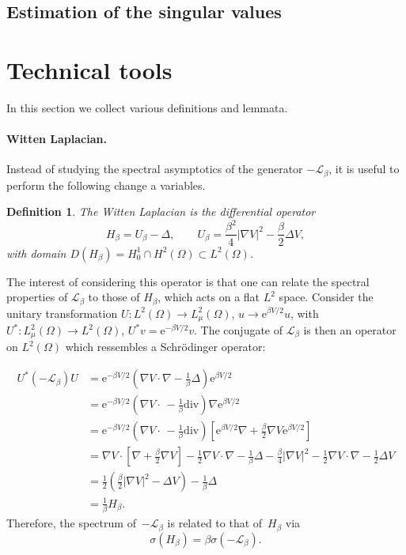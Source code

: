 \documentclass[10pt]{article}
\newcommand{\cL}{\mathcal{L}}
\newcommand{\e}{\mathrm{e}}
\newcommand{\1}{\mathbbm 1}
\newtheorem{definition}{Definition}
\begin{document}
        \subsection{Estimation of the singular values}

    \section{Technical tools}
    In this section we collect various definitions and lemmata.

    \paragraph{Witten Laplacian.\newline}
    Instead of studying the spectral asymptotics of the generator $-\cL_\beta$, it is useful to perform the following change a variables.
    \begin{definition}
        The Witten Laplacian is the differential operator
        \label{def:witten_laplacian}
        \begin{equation}\label{eq:witten_laplacian}
            H_{\beta} = U_\beta - \Delta,\qquad U_\beta = \frac{\beta^2}4|\nabla V|^2 - \frac{\beta}2 \Delta V,
        \end{equation}
        with domain $D(H_\beta)=H_0^1\cap H^2(\Omega) \subset L^2(\Omega)$.
    \end{definition}
    The interest of considering this operator is that one can relate the spectral properties of $\cL_\beta$ to those of $H_\beta$, which acts on a flat $L^2$ space.
    Consider the unitary transformation $ U:L^2(\Omega) \to L^2_\mu(\Omega)$, $u \to \e^{\beta V/2}u$, with $U^* : L^2_\mu(\Omega) \to L^2(\Omega)$, $U^* v = \e^{-\beta V/2}v $.
    The conjugate of $\cL_\beta$ is then an operator on $L^2(\Omega)$ which ressembles a Schr\"odinger operator:

    \[ \begin{aligned}U^* (-\cL_\beta) U &= \e^{-\beta V/2}\left(\nabla V \cdot \nabla - \frac1\beta \Delta\right)\e^{\beta V/2}\\
         &= \e^{-\beta V/2}\left( \nabla V \cdot \,-\frac1\beta \mathrm{div}\right) \nabla \e^{\beta V/2}\\
        &= \e^{-\beta V/2}\left(\nabla V\cdot \,-\frac1\beta \mathrm{div}\right)\left[\e^{\beta V/2}\nabla + \frac\beta2\nabla V\e^{\beta V/2}\right]\\
        &=\nabla V\cdot \left[\nabla + \frac\beta2\nabla V\right] -\frac12\nabla V\cdot \nabla -\frac1\beta\Delta - \frac\beta4|\nabla V|^2 - \frac12 \nabla V\cdot \nabla -\frac12\Delta V \\
    &= \frac12(\frac\beta2|\nabla V|^2 -\Delta V) -\frac1\beta \Delta \\
    &=\frac1\beta H_{\beta}.\end{aligned}\]
    Therefore, the spectrum of~$-\cL_\beta$ is related to that of~$H_\beta$ via
    \[ \sigma\left(H_\beta\right) = \beta \sigma\left(-\cL_\beta\right).\]
\end{document}
